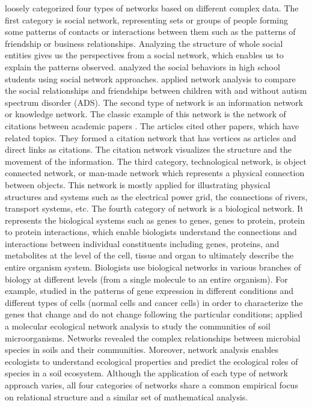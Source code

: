  loosely categorized four types of networks based on different complex data. The first category is social network, representing sets or groups of people forming some patterns of contacts or interactions between them such as the patterns of friendship or business relationships. Analyzing the structure of whole social entities gives us the perspectives from a social network, which enables us to explain the patterns observed.  analyzed the social behaviors in high school students using social network approaches.  applied network analysis to compare the social relationships and friendships between children with and without autism spectrum disorder (ADS). The second type of network is an information network or knowledge network. The classic example of this network is the network of citations between academic papers . The articles cited other papers, which have related topics. They formed a citation network that has vertices as articles and direct links as citations. The citation network visualizes the structure and the movement of the information. The third category, technological network, is object connected network, or man-made network which represents a physical connection between objects. This network is mostly applied for illustrating physical structures and systems such as the electrical power grid, the connections of rivers, transport systems, etc. The fourth category of network is a biological network. It represents the biological systems such as genes to genes, genes to protein, protein to protein interactions, which enable biologists understand the connections and interactions between individual constituents including genes, proteins, and metabolites at the level of the cell, tissue and organ to ultimately describe the entire organism system. Biologists use biological networks in various branches of biology at different levels (from a single molecule to an entire organism). For example,  studied in the patterns of gene expression in different conditions and different types of cells (normal cells and cancer cells) in order to characterize the genes that change and do not change following the particular conditions;  applied a molecular ecological network analysis to study the communities of soil microorganisms. Networks revealed the complex relationships between microbial species in soils and their communities. Moreover, network analysis enables ecologists to understand ecological properties and predict the ecological roles of species in a soil ecosystem. Although the application of each type of network approach varies, all four categories of networks share a common empirical focus on relational structure and a similar set of mathematical analysis. 

